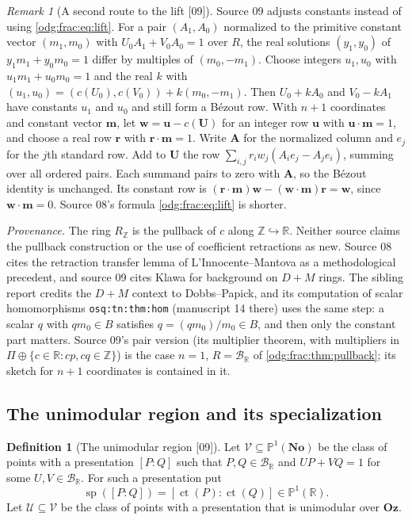 \documentclass[11pt,oneside]{article}
\numberwithin{equation}{section}
\theoremstyle{definition}
\newtheorem{definition}[definition]{Definition}
\theoremstyle{remark}
\newtheorem{remark}[remark]{Remark}
\newcommand{\No}{\mathbf{No}}
\newcommand{\Oz}{\mathbf{Oz}}
\newcommand{\Z}{\mathbb Z}
\newcommand{\R}{\mathbb R}
\newcommand{\BR}{\mathcal B_{\R}}
\newcommand{\ct}{\operatorname{ct}}
\newcommand{\src}[1]{\textup{\textsf{\small[#1]}}}
\newcommand{\status}[1]{\par\smallskip\noindent\textit{Provenance.} #1\par\smallskip}
\newcommand{\replabel}[1]{\nolinkurl{#1}}
\newcommand{\spz}{\operatorname{sp}}
\newcommand{\Vreg}{\mathcal V}
\newcommand{\Ureg}{\mathcal U}
\begin{document}
\begin{remark}[A second route to the lift \src{09}]\label{odg:frac:rem:lift}
Source 09 adjusts constants instead of using \eqref{odg:frac:eq:lift}. For a
pair $(A_1,A_0)$ normalized to the primitive constant vector $(m_1,m_0)$ with
$U_0A_1+V_0A_0=1$ over $R$, the real solutions $(y_1,y_0)$ of
$y_1m_1+y_0m_0=1$ differ by multiples of $(m_0,-m_1)$. Choose integers
$u_1,u_0$ with $u_1m_1+u_0m_0=1$ and the real $k$ with
$(u_1,u_0)=(c(U_0),c(V_0))+k(m_0,-m_1)$. Then $U_0+kA_0$ and $V_0-kA_1$ have
constants $u_1$ and $u_0$ and still form a B\'ezout row. With $n+1$ coordinates
and constant vector $\mathbf m$, let $\mathbf w=\mathbf u-c(\mathbf U)$ for an
integer row $\mathbf u$ with $\mathbf u\cdot\mathbf m=1$, and choose a real row
$\mathbf r$ with $\mathbf r\cdot\mathbf m=1$. Write $\mathbf A$ for the
normalized column and $e_j$ for the $j$th standard row. Add to $\mathbf U$
the row $\sum_{i,j}r_iw_j(A_ie_j-A_je_i)$, summing over all ordered pairs.
Each summand pairs to zero with $\mathbf A$, so the B\'ezout identity is
unchanged. Its constant row is
$(\mathbf r\cdot\mathbf m)\mathbf w-(\mathbf w\cdot\mathbf m)\mathbf r=\mathbf w$,
since $\mathbf w\cdot\mathbf m=0$. Source 08's formula \eqref{odg:frac:eq:lift}
is shorter.
\end{remark}

\status{The ring $R_\Z$ is the pullback of $c$ along $\Z\hookrightarrow\R$.
Neither source claims the pullback construction or the use of coefficient
retractions as new. Source 08 cites the retraction transfer lemma of
L'Innocente--Mantova \cite[Lemma 9.2.1]{LM} as a methodological precedent, and
source 09 cites Klawa \cite{Klawa} for background on $D+M$ rings. The sibling
report credits the $D+M$ context to Dobbs--Papick, and its computation of
scalar homomorphisms \replabel{osq:tn:thm:hom} (manuscript 14 there) uses the
same step: a scalar $q$ with $qm_0\in B$ satisfies $q=(qm_0)/m_0\in B$, and then
only the constant part matters. Source 09's pair version (its multiplier
theorem, with multipliers in $\Pi\oplus\{c\in\R:cp,cq\in\Z\}$) is the case
$n=1$, $R=\BR$ of \cref{odg:frac:thm:pullback}; its sketch for $n+1$
coordinates is contained in it.}

\subsection{The unimodular region and its specialization}\label{odg:frac:sub:region}

\begin{definition}[The unimodular region \src{09}]\label{odg:frac:def:region}
Let $\Vreg\subseteq\mathbb P^1(\No)$ be the class of points with a presentation
$[P:Q]$ such that $P,Q\in\BR$ and $UP+VQ=1$ for some $U,V\in\BR$. For such a
presentation put
\[
 \spz([P:Q])=[\ct(P):\ct(Q)]\in\mathbb P^1(\R).
\]
Let $\Ureg\subseteq\Vreg$ be the class of points with a presentation that is
unimodular over $\Oz$.
\end{definition}
\end{document}

